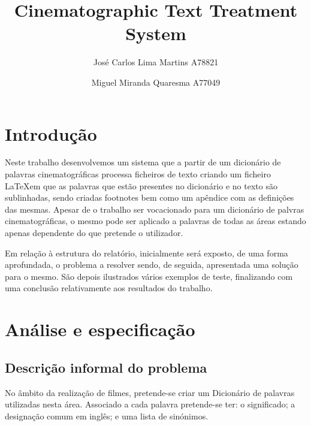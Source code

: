 \documentclass{llncs}
\begin{document}
 \mainmatter
\title{Cinematographic Text Treatment System}
\author{José Carlos Lima Martins A78821 \and
        Miguel Miranda Quaresma A77049}

\maketitle

\justify

\begin{abstract}

\end{abstract}

\section{Introdução}
Neste trabalho desenvolvemos um sistema que a partir de um dicionário de palavras cinematográficas processa ficheiros de texto criando um ficheiro \LaTeX em que as palavras que estão presentes no dicionário e no texto são sublinhadas, sendo criadas footnotes bem como um apêndice com as definições das mesmas. Apesar de o trabalho ser vocacionado para um dicionário de palvras cinematográficas, o mesmo pode ser aplicado a palavras de todas as áreas estando apenas dependente do que pretende o utilizador.

Em relação à estrutura do relatório, inicialmente será exposto, de uma forma aprofundada, o problema a resolver sendo, de seguida, apresentada uma solução para o mesmo. São depois ilustrados vários exemplos de teste, finalizando com uma conclusão relativamente aos resultados do trabalho.

\section{Análise e especificação}

\subsection{Descrição informal do problema}
No âmbito da realização de filmes, pretende-se criar um Dicionário de palavras utilizadas nesta área. Associado a cada palavra pretende-se ter: o significado; a designação comum em inglês; e uma lista de sinónimos.
\end{document}
